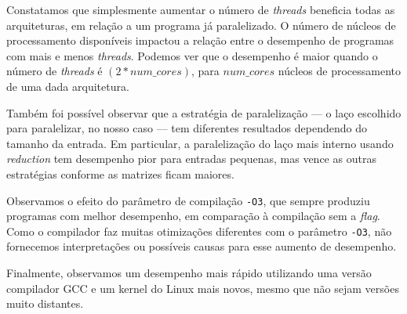 \documentclass[a4paper, 12pt]{article}
\begin{document}
Constatamos que simplesmente aumentar o número de \textit{threads}
beneficia todas as arquiteturas, em relação a um programa
já paralelizado. O número de núcleos de processamento disponíveis
impactou a relação entre o desempenho de programas com mais e
menos \textit{threads}. Podemos ver que o desempenho é maior
quando o número de \textit{threads} é $(2*num\_cores)$, para
$num\_cores$ núcleos de processamento de uma dada arquitetura.

Também foi possível observar que a estratégia de paralelização ---
o laço escolhido para paralelizar, no nosso caso --- tem diferentes
resultados dependendo do tamanho da entrada. Em particular, a
paralelização do laço mais interno usando \textit{reduction}
tem desempenho pior para entradas pequenas, mas vence as outras
estratégias conforme as matrizes ficam maiores.

Observamos o efeito do parâmetro de compilação \texttt{-O3},
que sempre produziu programas com melhor desempenho, em comparação à
compilação sem a \textit{flag}. Como o compilador faz muitas otimizações
diferentes com o parâmetro \texttt{-O3}, não fornecemos interpretações ou
possíveis causas para esse aumento de desempenho.

Finalmente, observamos um desempenho mais rápido utilizando uma versão 
compilador GCC e um kernel do Linux mais novos, mesmo que não sejam versões 
muito distantes.

%
%
\end{document}
